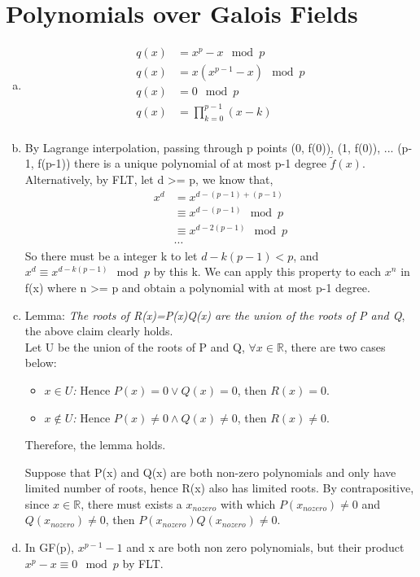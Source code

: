 \documentclass{article}
\begin{document}
\part*{Polynomials over Galois Fields}
\begin{enumerate}[(a).]
    \item \begin{align*}
        q(x) &= x^p - x \mod{p}\\
        q(x) &= x(x^{p-1} - x) \mod{p}\\
        q(x) &= 0 \mod{p}\\
        q(x) &= \prod\limits_{k=0}^{p-1} (x-k)\\
    \end{align*}
    
    \item By Lagrange interpolation, passing through p points (0, f(0)), (1, f(0)), ... (p-1, f(p-1)) 
    there is a unique polynomial of at most p-1 degree $\widetilde{f}(x)$.\\
    
    Alternatively, by FLT, let d >= p, we know that, 
    \begin{align*}
        x^d &= x^{d-(p-1)+(p-1)}\\
        &\equiv x^{d-(p-1)} \mod{p}\\
        &\equiv x^{d-2(p-1)} \mod{p}\\
        &\cdots
    \end{align*}
    So there must be a integer k to let $d-k(p-1) < p$, and $x^d \equiv x^{d-k(p-1)} \mod{p}$ by this k. 
    We can apply this property to each $x^n$ in f(x) where n >= p and obtain a polynomial with at most p-1 degree. 


    \item Lemma: \emph{The roots of R(x)=P(x)Q(x) are the union of the roots of P and Q}, the above claim clearly holds. \\
    Let U be the union of the roots of P and Q, $\forall x \in \mathbb{R}$, there are two cases below: 
    \begin{itemize}
        \item \emph{$x \in U$: }Hence $P(x) = 0 \vee Q(x) = 0$, then $R(x) = 0$. 
        \item \emph{$x \notin U$: }Hence $P(x) \not= 0 \wedge Q(x) \not=0$, then $R(x) \not= 0$. 
    \end{itemize}
    Therefore, the lemma holds.

    Suppose that P(x) and Q(x) are both non-zero polynomials and only have limited number of roots, hence R(x) also has limited roots. 
    By contrapositive, since $x \in \mathbb{R}$, there must exists a $x_{nozero}$ with which $P(x_{nozero}) \not= 0$ and $Q(x_{nozero})\not=0$, then $P(x_{nozero})Q(x_{nozero})\not=0$. 

    \item In GF(p), $x^{p-1} - 1$ and x are both non zero polynomials, but their product $x^p - x \equiv 0 \mod{p}$ by FLT. 
\end{enumerate}
\end{document}
